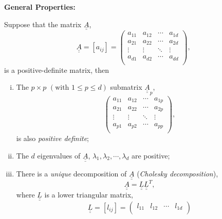 \begin{shaded}
\begin{center}{\bf General Properties:}\end{center}
Suppose that the matrix $\underline{\underline{A}}$,
\begin{displaymath}
  \underline{\underline{A}} = \left[a_{ij}\right] =
\begin{pmatrix}
  a_{11}    &   a_{12}     & \cdots   & a_{1d}   \\
  a_{21}    &   a_{22}     & \cdots   & a_{2d}   \\
  \vdots   &    \vdots   & \ddots   & \vdots  \\
  a_{d1}    &   a_{d2}     & \cdots   & a_{dd}   \\
\end{pmatrix},
\end{displaymath}
is a positive-definite matrix, then
\begin{enumerate}[i)]
%
   \item\label{prop1} The $p\times p$ $\left(\text{with }1\le p\le d\right)$ submatrix $\underline{\underline{A}}_{p}$, 
\begin{displaymath}
\begin{pmatrix}
  a_{11}    &   a_{12}     & \cdots   & a_{1p}   \\
  a_{21}    &   a_{22}     & \cdots   & a_{2p}   \\
  \vdots   &    \vdots   & \ddots   & \vdots  \\
  a_{p1}    &   a_{p2}     & \cdots   & a_{pp}   \\
\end{pmatrix},
\end{displaymath}
is also {\it positive definite};
%
   \item\label{prop2} The $d$ eigenvalues of $\underline{\underline{A}}$, $\lambda_{1}, \lambda_{2}, \cdots, \lambda_{d}$ are positive;
%
   \item\label{prop3} There is a {\it unique} decomposition of $\underline{\underline{A}}$ ({\it Cholesky decomposition}),
     \begin{equation}
       \underline{\underline{A}} =  \underline{\underline{L}}\underline{\underline{L}}^{T},
     \end{equation}
     where $\underline{\underline{L}}$ is a lower triangular matrix, 
     \begin{displaymath}
       \underline{\underline{L}} = \left[l_{ij}\right] =
\begin{pmatrix}
  l_{11}    &   l_{12}     & \cdots   & l_{1d}   \\

\end{pmatrix}
\end{displaymath}
\end{enumerate}
\end{shaded}
